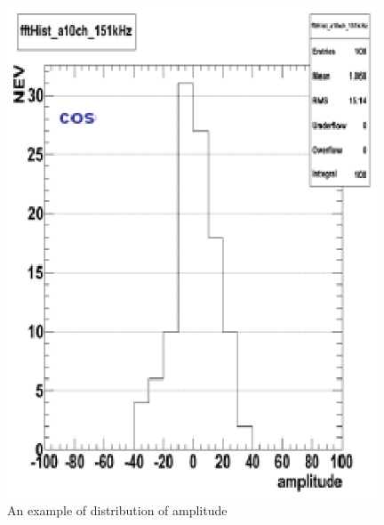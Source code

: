 \begin{figure}[!htb]
  \centering
  \centering
  \includegraphics[width=11cm,clip]{./fig/cos.eps}
  \caption{An example of distribution of amplitude}
  \label{ampDist}
\end{figure}

